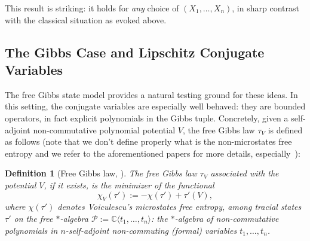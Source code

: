 \documentclass[10pt,a4paper,reqno]{amsart}
\newtheorem{definition}[theorem]{Definition}
\begin{document}
This result is striking: it holds for \emph{any} choice of $(X_1,\ldots,X_n)$, in sharp contrast with the classical situation as evoked above.

\subsection{The Gibbs Case and Lipschitz Conjugate Variables}

The free Gibbs state model provides a natural testing ground for these ideas. In this setting, the conjugate variables are especially well behaved: they are bounded operators, in fact explicit polynomials in the Gibbs tuple. Concretely, given a self-adjoint non-commutative polynomial potential $V$, the free Gibbs law $\tau_V$ is defined as follows (note that we don't define properly what is the non-microstates free entropy and we refer to the aforementioned papers for more details, especially~\cite{Voic2}):

\begin{definition}[Free Gibbs law, \cite{GM,FN,VF}]
The free Gibbs law $\tau_V$ associated with the potential $V$, if it exists, is the minimizer of the functional
\begin{equation}
\chi_V(\tau'):=-\chi(\tau')+\tau'(V),
\end{equation}
where $\chi(\tau')$ denotes Voiculescu’s microstates free entropy, among tracial states $\tau'$ on the free $*$-algebra $\mathscr{P}:=\mathbb C\langle t_1,\ldots,t_n\rangle$: the $*$-algebra of non-commutative polynomials in $n$-self-adjoint non-commuting (formal) variables $t_1,\ldots,t_n$.
\end{definition}
\end{document}
